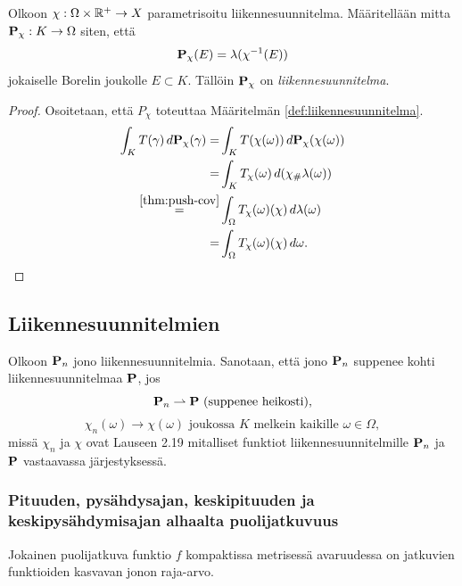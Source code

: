 \begin{theorem}
    Olkoon $\chi : \Omega \times \R^+ \to X$ parametrisoitu liikennesuunnitelma.
    Määritellään mitta $\P_\chi : K \to \Omega$ siten, että \[\P_\chi (E) = \lambda(\chi^{-1}(E))\] jokaiselle Borelin joukolle $E\subset K$. 
    Tällöin $\P_\chi$ on \textit{liikennesuunnitelma}. 
\end{theorem}

\begin{proof}
Osoitetaan, että $P_\chi$ toteuttaa Määritelmän \ref{def:liikennesuunnitelma}.
\begin{align*}
    \int_K T(\gamma)\, d\P_\chi(\gamma) = &\int_K T(\chi(\omega))\, d\P_\chi(\chi(\omega)) \\
    =& \int_K T_\chi(\omega) \, d(\chi_\# \lambda(\omega)) \\
    \stackrel{\ref{thm:push-cov}}{=}& \int_\Omega T_\chi(\omega)(\chi) \, d\lambda(\omega) \\
    =& \int_\Omega T_\chi(\omega)(\chi) \, d\omega. 
\end{align*}

\end{proof}



\subsection{Liikennesuunnitelmien }
\begin{definition}
    Olkoon $\P_n$ jono liikennesuunnitelmia. Sanotaan, että jono $\P_n$ suppenee kohti liikennesuunnitelmaa $\P$, jos 
    $$\P_n \rightharpoonup \P \text{ (suppenee heikosti)},$$
    $$ \chi_n (\omega) \to  \chi (\omega) \text{ joukossa } K \text{ melkein kaikille } \omega
    \in \Omega,$$
    missä $ \chi_n$ ja $ \chi$ ovat Lauseen 2.19 mitalliset funktiot liikennesuunnitelmille $\P_n$ ja $\P$ vastaavassa järjestyksessä.
\end{definition}

\subsubsection{Pituuden, pysähdysajan, keskipituuden ja keskipysähdymisajan alhaalta puolijatkuvuus}

\begin{lemma}
    Jokainen puolijatkuva funktio $f$ kompaktissa metrisessä avaruudessa on jatkuvien funktioiden kasvavan jonon raja-arvo.
\end{lemma}


